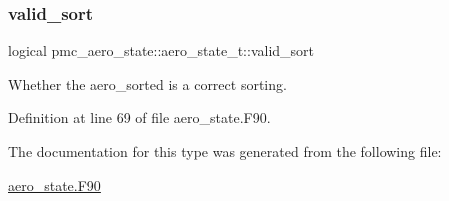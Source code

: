 \subsubsection{\texorpdfstring{valid\+\_\+sort}{valid\_sort}}
{\footnotesize\ttfamily logical pmc\+\_\+aero\+\_\+state\+::aero\+\_\+state\+\_\+t\+::valid\+\_\+sort}



Whether the {\ttfamily aero\+\_\+sorted} is a correct sorting. 



Definition at line 69 of file aero\+\_\+state.\+F90.



The documentation for this type was generated from the following file\+:\begin{DoxyCompactItemize}
\item 
\mbox{\hyperlink{aero__state_8_f90}{aero\+\_\+state.\+F90}}\end{DoxyCompactItemize}
